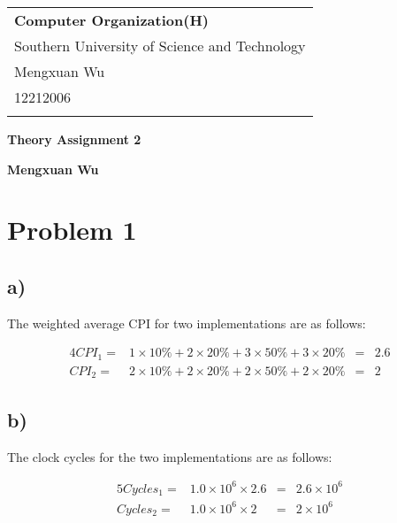 \documentclass[a4paper,12pt]{article}
\begin{document}
\thispagestyle{empty} %

\begin{tabular}{p{15.5cm}}
{\large \bf Computer Organization(H)} \\
Southern University of Science and Technology \\ Mengxuan Wu \\ 12212006 \\
\hline
\\
\end{tabular}

\vspace*{0.3cm} %

\begin{center}
	{\Large \bf Theory Assignment 2}
	\vspace{2mm}

	{\bf Mengxuan Wu}
		
\end{center}  

\vspace{0.4cm}

\section*{Problem 1}

\subsection*{a)}

The weighted average CPI for two implementations are as follows:

\begin{alignat*}{4}
	CPI_1 =& 1 \times 10\% + 2 \times 20\% + 3 \times 50\% + 3 \times 20\% &=& 2.6 \\
	CPI_2 =& 2 \times 10\% + 2 \times 20\% + 2 \times 50\% + 2 \times 20\% &=& 2
\end{alignat*}

\subsection*{b)}

The clock cycles for the two implementations are as follows:

\begin{alignat*}{5}
	Cycles_1 =& 1.0 \times 10^6 \times 2.6 &=& 2.6 \times 10^6 \\
	Cycles_2 =& 1.0 \times 10^6 \times 2 &=& 2 \times 10^6
\end{alignat*}
\end{document}
